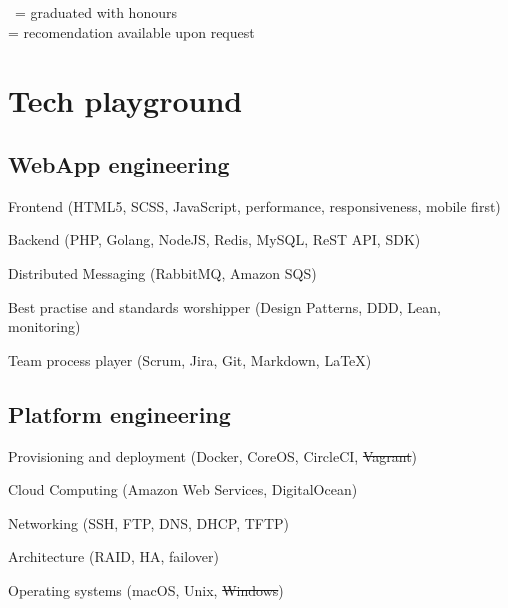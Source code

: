 \documentclass[letterpaper]{article}
\renewenvironment{itemize}{
    \begin{list}{}{
        \setlength{\leftmargin}{1.5em}
    }
}{
    \end{list}
}
\begin{document}
        \vfill

        \begin{flushright}
            \begin{footnotesize}
                \faTrophy\ = graduated with honours \\
                \faThumbsOUp = recomendation available upon request
            \end{footnotesize}
        \end{flushright}

    \section*{\faCode{} Tech playground}

        \subsection*{WebApp engineering}

            \begin{itemize}
                \item Frontend (HTML5, SCSS, JavaScript, performance, responsiveness, mobile first)
                \item Backend (PHP, Golang, NodeJS, Redis, MySQL, ReST API, SDK)
                \item Distributed Messaging (RabbitMQ, Amazon SQS)
                \item Best practise and standards worshipper (Design Patterns, DDD, Lean, monitoring)
                \item Team process player (Scrum, Jira, Git, Markdown, \LaTeX)
            \end{itemize}

        \subsection*{Platform engineering}

            \begin{itemize}
                \item Provisioning and deployment (Docker, CoreOS, CircleCI, \sout{Vagrant})
                \item Cloud Computing (Amazon Web Services, DigitalOcean)
                \item Networking (SSH, FTP, DNS, DHCP, TFTP)
                \item Architecture (RAID, HA, failover)
                \item Operating systems (macOS, Unix, \sout{Windows})
            \end{itemize}
\end{document}
